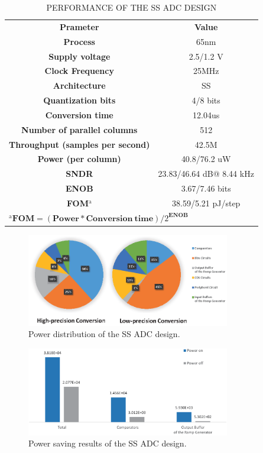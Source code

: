\begin{table}[htbp]
	\caption{PERFORMANCE OF THE SS ADC DESIGN}
	\begin{center}
		\begin{tabular}{|c|c|}
			\hline
			\textbf{Prameter}& \textbf{Value} \\
			\hhline{|==|}
			\textbf{Process}& 65nm \\
			\hline 
			\textbf{Supply voltage}& 2.5/1.2 V \\
			\hline
			\textbf{Clock Frequency}&	25MHz \\
			\hline
			\textbf{Architecture}&	SS \\
			\hline
			\textbf{Quantization bits}&	4/8 bits\\
			\hline
			\textbf{Conversion time}&	12.04us \\
			\hline
			\textbf{Number of parallel columns}&	512 \\
			\hline
			\textbf{Throughput (samples per second)}&	42.5M \\ 
			\hline
			\textbf{Power (per column)}&	40.8/76.2 uW \\
			\hline
			\textbf{SNDR}& 23.83/46.64 dB@ 8.44 kHz\\
			\hline
			\textbf{ENOB}& 3.67/7.46 bits\\
			\hline
			\textbf{FOM$^{\mathrm{a}}$}& 38.59/5.21 pJ/step\\
			\hline
			\multicolumn{2}{l}{$^{\mathrm{a}}\textbf{FOM}=(\textbf{Power}\ast \textbf{Conversion}\ \textbf{time})/2^{\textbf{ENOB}}$ }	    
		\end{tabular}
		\label{tab1}
	\end{center}
\end{table}

\begin{figure}[htbp]
	\centerline{\includegraphics[width=3.5in]{./Figures/SSResults1.eps}}
	\caption{Power distribution of the SS ADC design.}
	\label{SSresults1}
\end{figure}

\begin{figure}[htbp]
	\centerline{\includegraphics[width=3.5in]{./Figures/SSResults2.eps}}
	\caption{Power saving results of the SS ADC design.}
	\label{SSresults2}
\end{figure} 

